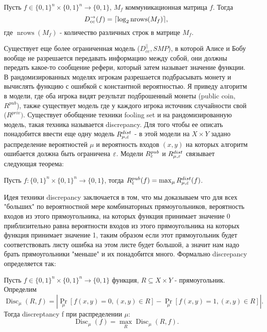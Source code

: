 \documentclass{article}
\begin{document}
\begin{theorem}
    \label{th:dccto}
    Пусть $f \in \{0, 1\}^n\times \{0, 1\}^n \to \{0, 1\}$, $M_f$ коммуникационная матрица $f$. 
    Тогда $$D_{cc}^{\to}(f) = \lceil\log_2{\operatorname{nrows}(M_f)}\rceil,$$ где $\operatorname{nrows}(M_f)$ - количество различных строк в матрице $M_f$. 
\end{theorem}
 Существует еще более ограниченная модель ($D^{||}_{cc}, SMP$), в которой Алисе и Бобу вообще не разрешается передавать информацию между собой, они должны передать какое-то сообщение рефери, который затем называет значение функции. \\
 В рандомизированных моделях игрокам разрешается подбрасывать монету и вычислять функцию с ошибкой с константной вероятностью. Я приведу алгоритм в модели, где оба игрока видят результат подброшенный монеты (public coin, $R^{pub}$), также существует модель где у каждого игрока источник случайности свой ($R^{priv})$. Существует обобщение техники fooling set и на рандомизированную модель, такая техника называется discrepancy. Для того чтобы ее описать понадобится ввести еще одну модель $R^{dist}_{\mu, \varepsilon}$ - в этой модели на $X \times Y$ задано распределение вероятностей $\mu$ и вероятность входов $(x, y)$ на которых алгоритм ошибается должна быть ограничена $\varepsilon$. Модели $R^{pub}_{\varepsilon}$ и $R^{dist}_{\mu, \varepsilon}$ связывает следующая теорема:~\cite{nisan}
 \begin{theorem}
    Пусть $f: \{0, 1\}^n\times\{0, 1\}^n \to \{0, 1\}$, тогда $R^{pub}_{\varepsilon}(f) = \max_{\mu}R^{dist}_{\mu, \varepsilon}(f)$.
 \end{theorem}
  Идея техники discrepancy заключается в том, что мы доказываем что для всех "больших" по вероятностной мере комбинаторных прямоугольников, вероятность входов из этого прямоугольника, на которых функция принимает значение 0 приблизительно равна вероятности входов из этого прямоугольника на которых функция принимает значение 1, таким образом если этот прямоугольник будет соответствовать листу ошибка на этом листе будет большой, а значит нам надо брать прямоугольники "меньше" и их понадобится много. Формально discrepancy определяется так:
  \begin{definition}
    Пусть $f \in \{0, 1\}^n\times \{0, 1\}^n \to \{0, 1\}$ функция, $R \subseteq X \times Y$ - прямоугольник. Определим $$\operatorname{Disc}_{\mu}(R, f) = |\operatorname{Pr}_{\mu}[f(x, y) = 0, (x, y) \in R] - \operatorname{Pr}_{\mu}[f(x, y) = 1, (x, y) \in R]|.$$
    Тогда discreptancy f при распределении $\mu$:
    $$\operatorname{Disc}_{\mu}(f) = \max_{R}\operatorname{Disc}_{\mu}(R, f).$$
  \end{definition}  
\end{document}
